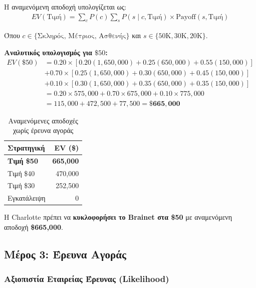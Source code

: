 \documentclass[a4paper,12pt]{article}
\begin{document}
Η αναμενόμενη αποδοχή υπολογίζεται ως:
\begin{align}
EV(\text{Τιμή}) = \sum_{c} P(c) \sum_{s} P(s \mid c, \text{Τιμή}) \times \text{Payoff}(s, \text{Τιμή})
\end{align}

Όπου $c \in \{\text{Σκληρός, Μέτριος, Ασθενής}\}$ και $s \in \{50\text{K}, 30\text{K}, 20\text{K}\}$.

\textbf{Αναλυτικός υπολογισμός για $\$50$:}
\begin{align}
EV(\$50) &= 0.20 \times [0.20(1{,}650{,}000) + 0.25(650{,}000) + 0.55(150{,}000)] \nonumber \\
&+ 0.70 \times [0.25(1{,}650{,}000) + 0.30(650{,}000) + 0.45(150{,}000)] \nonumber \\
&+ 0.10 \times [0.30(1{,}650{,}000) + 0.35(650{,}000) + 0.35(150{,}000)] \nonumber \\
&= 0.20 \times 575{,}000 + 0.70 \times 675{,}000 + 0.10 \times 775{,}000 \nonumber \\
&= 115{,}000 + 472{,}500 + 77{,}500 = \mathbf{\$665{,}000}
\end{align}

\begin{table}[H]
\centering
\begin{tabular}{lr}
\toprule
\textbf{Στρατηγική} & \textbf{EV (\$)} \\
\midrule
\textbf{Τιμή \$50} & \textbf{665,000} \\
Τιμή \$40 & 470,000 \\
Τιμή \$30 & 252,500 \\
Εγκατάλειψη & 0 \\
\bottomrule
\end{tabular}
\caption{Αναμενόμενες αποδοχές χωρίς έρευνα αγοράς}
\end{table}

\begin{tcolorbox}[colback=blue!10, colframe=resultblue, title=Απόφαση Bayes (χωρίς έρευνα)]
Η Charlotte πρέπει να \textbf{κυκλοφορήσει το Brainet στα \$50} με αναμενόμενη αποδοχή \textbf{\$665,000}.
\end{tcolorbox}

\subsection{Μέρος 3: Έρευνα Αγοράς}

\subsubsection{Αξιοπιστία Εταιρείας Έρευνας (Likelihood)}
\end{document}
